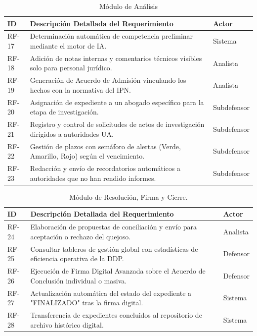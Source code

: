 \begin{table}[h!]
\centering
\scriptsize
\caption{Módulo de Análisis}
\label{tab:rf_analisis}
\begin{tabular}{@{} l p{9.5cm} l @{}}
\toprule
\rowcolor[HTML]{2D3E50} 
\textbf{\color[HTML]{FFFFFF} ID} & \textbf{\color[HTML]{FFFFFF} Descripción Detallada del Requerimiento} & \textbf{\color[HTML]{FFFFFF} Actor} \\ \midrule
RF-17 & Determinación automática de competencia preliminar mediante el motor de IA. & Sistema \\
\rowcolor[HTML]{F2F4F7} 
RF-18 & Adición de notas internas y comentarios técnicos visibles solo para personal jurídico. & Analista \\
RF-19 & Generación de Acuerdo de Admisión vinculando los hechos con la normativa del IPN. & Analista \\
\rowcolor[HTML]{F2F4F7} 
RF-20 & Asignación de expediente a un abogado específico para la etapa de investigación. & Subdefensor \\
RF-21 & Registro y control de solicitudes de actos de investigación dirigidos a autoridades UA. & Subdefensor \\
\rowcolor[HTML]{F2F4F7} 
RF-22 & Gestión de plazos con semáforo de alertas (Verde, Amarillo, Rojo) según el vencimiento. & Subdefensor \\
RF-23 & Redacción y envío de recordatorios automáticos a autoridades que no han rendido informes. & Subdefensor \\ \bottomrule
\end{tabular}
\end{table}

\begin{table}[h!]
\centering
\scriptsize
\caption{Módulo de Resolución, Firma y Cierre.}
\label{tab:rf_resolucion}
\begin{tabular}{@{} l p{9.5cm} l @{}}
\toprule
\rowcolor[HTML]{2D3E50} 
\textbf{\color[HTML]{FFFFFF} ID} & \textbf{\color[HTML]{FFFFFF} Descripción Detallada del Requerimiento} & \textbf{\color[HTML]{FFFFFF} Actor} \\ \midrule
RF-24 & Elaboración de propuestas de conciliación y envío para aceptación o rechazo del quejoso. & Analista \\
\rowcolor[HTML]{F2F4F7} 
RF-25 & Consultar tableros de gestión global con estadísticas de eficiencia operativa de la DDP. & Defensor \\
RF-26 & Ejecución de Firma Digital Avanzada sobre el Acuerdo de Conclusión individual o masiva. & Defensor \\
\rowcolor[HTML]{F2F4F7} 
RF-27 & Actualización automática del estado del expediente a "FINALIZADO" tras la firma digital. & Sistema \\
RF-28 & Transferencia de expedientes concluidos al repositorio de archivo histórico digital. & Sistema \\ \bottomrule
\end{tabular}
\end{table}

